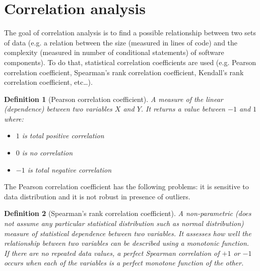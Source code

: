\documentclass[a4paper,11pt]{report}
\newtheorem{definition}{Definition}
\begin{document}
\section{Correlation analysis}
The goal of correlation analysis is to find a possible relationship between two
sets of data (e.g. a relation between the size (measured in lines of code) and
the complexity (measured in number of conditional statements) of software
components). To do that, statistical correlation coefficients are used (e.g.
Pearson correlation coefficient, Spearman’s rank correlation coefficient,
Kendall’s rank correlation coefficient, etc\dots).

\begin{definition}[Pearson correlation coefficient]
A measure of the linear (dependence) between two variables $X$ and $Y$. It
returns a value between $-1$ and $1$ where:
\begin{itemize}
\item $1$ is total positive correlation
\item $0$ is no correlation
\item $-1$ is total negative correlation
\end{itemize}
\end{definition}

The Pearson correlation coefficient has the following problems: it is sensitive
to data distribution and it is not robust in presence of outliers.

\begin{definition}[Spearman’s rank correlation coefficient]
A non-parametric (does not assume any particular statistical distribution such
as normal distribution) measure of statistical dependence between two variables.
It assesses how well the relationship between two variables can be described
using a monotonic function.\\

If there are no repeated data values, a perfect Spearman correlation of $+1$ or
$-1$ occurs when each of the variables is a perfect monotone function of the
other.
\end{definition}
\end{document}
